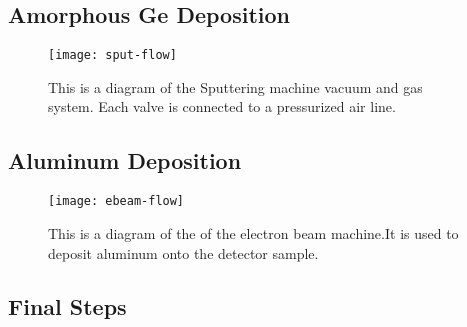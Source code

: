 \subsection{Amorphous Ge Deposition}

\begin{sidewaysfigure}
\texttt{[image: sput-flow]}
\caption{This is a diagram of the Sputtering machine vacuum and gas system. Each valve is connected to a pressurized air line.}
\label{LandscapeFigure}
\end{sidewaysfigure}

\subsection{Aluminum Deposition}

\begin{sidewaysfigure}
\texttt{[image: ebeam-flow]}
\caption{This is a diagram of the of the electron beam machine.It is used to deposit aluminum onto the detector sample.}
\label{LandscapeFigure}
\end{sidewaysfigure}


\subsection{Final Steps}
